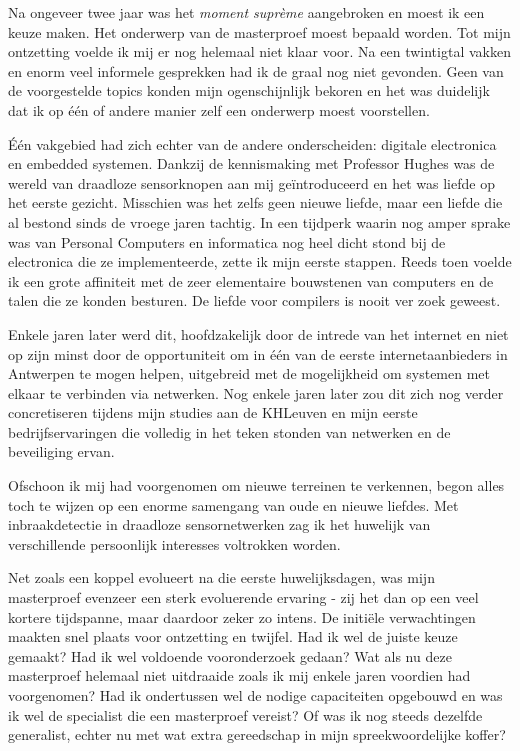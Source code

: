 Na ongeveer twee jaar was het \emph{moment supr\`eme} aangebroken en moest ik
een keuze maken. Het onderwerp van de masterproef moest bepaald worden. Tot
mijn ontzetting voelde ik mij er nog helemaal niet klaar voor. Na een
twintigtal vakken en enorm veel informele gesprekken had ik de graal nog niet
gevonden. Geen van de voorgestelde topics konden mijn ogenschijnlijk bekoren en
het was duidelijk dat ik op \'e\'en of andere manier zelf een onderwerp moest
voorstellen.

\'E\'en vakgebied had zich echter van de andere onderscheiden: digitale
electronica en embedded systemen. Dankzij de kennismaking met Professor Hughes
was de wereld van draadloze sensorknopen aan mij ge\"introduceerd en het was
liefde op het eerste gezicht. Misschien was het zelfs geen nieuwe liefde, maar
een liefde die al bestond sinds de vroege jaren tachtig. In een tijdperk waarin
nog amper sprake was van Personal Computers en informatica nog heel dicht stond
bij de electronica die ze implementeerde, zette ik mijn eerste stappen. Reeds
toen voelde ik een grote affiniteit met de zeer elementaire bouwstenen van
computers en de talen die ze konden besturen. De liefde voor compilers is nooit
ver zoek geweest.

Enkele jaren later werd dit, hoofdzakelijk door de intrede van het internet en
niet op zijn minst door de opportuniteit om in \'e\'en van de eerste
internetaanbieders in Antwerpen te mogen helpen, uitgebreid met de mogelijkheid
om systemen met elkaar te verbinden via netwerken. Nog enkele jaren later zou
dit zich nog verder concretiseren tijdens mijn studies aan de KHLeuven en mijn
eerste bedrijfservaringen die volledig in het teken stonden van netwerken en de
beveiliging ervan.

Ofschoon ik mij had voorgenomen om nieuwe terreinen te verkennen, begon alles
toch te wijzen op een enorme samengang van oude en nieuwe liefdes. Met
inbraakdetectie in draadloze sensornetwerken zag ik het huwelijk van
verschillende persoonlijk interesses voltrokken worden.

Net zoals een koppel evolueert na die eerste huwelijksdagen, was mijn
masterproef evenzeer een sterk evoluerende ervaring - zij het dan op een veel
kortere tijdspanne, maar daardoor zeker zo intens. De initi\"ele verwachtingen
maakten snel plaats voor ontzetting en twijfel. Had ik wel de juiste keuze
gemaakt? Had ik wel voldoende vooronderzoek gedaan? Wat als nu deze masterproef
helemaal niet uitdraaide zoals ik mij enkele jaren voordien had voorgenomen?
Had ik ondertussen wel de nodige capaciteiten opgebouwd en was ik wel de
specialist die een masterproef vereist? Of was ik nog steeds dezelfde
generalist, echter nu met wat extra gereedschap in mijn spreekwoordelijke
koffer?

